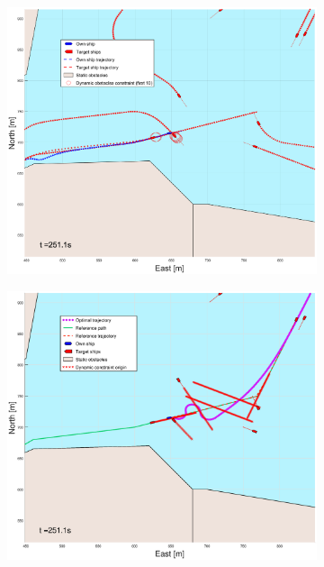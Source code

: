 \begin{figure}[ht!]
\begin{subfigure}[b]{0.499\textwidth}
    \end{subfigure}
    \hfill
    \\
    \begin{subfigure}[b]{0.49\textwidth}
        \centering
        \includegraphics[width=\textwidth]{Images/Figures/Trheimfjord/_Simple_1fig1_time=251}
    \end{subfigure}
    \hfill
    \begin{subfigure}[b]{0.499\textwidth}
        \centering
        \includegraphics[width=\textwidth]{Images/Figures/Trheimfjord/_Simple_1fig999_time=251}

\end{subfigure}
\end{figure}
